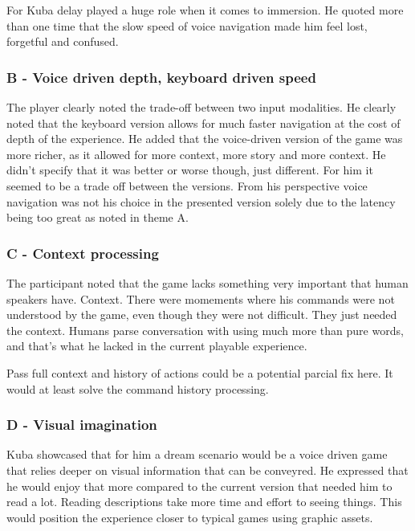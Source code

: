 For Kuba delay played a huge role when it comes to immersion. He quoted more than one time that the slow speed of voice navigation made him feel lost, forgetful and confused. 

\subsubsection{B - Voice driven depth, keyboard driven speed}

The player clearly noted the trade-off between two input modalities. He clearly noted that the keyboard version allows for much faster navigation at the cost of depth of the experience. He added that the voice-driven version of the game was more richer, as it allowed for more context, more story and more context. He didn't specify that it was better or worse though, just different. For him it seemed to be a trade off between the versions. From his perspective voice navigation was not his choice in the presented version solely due to the latency being too great as noted in theme A. 


\subsubsection{C - Context processing}

The participant noted that the game lacks something very important that human speakers have. Context. There were momements where his commands were not understood by the game, even though they were not difficult. They just needed the context. Humans parse conversation with using much more than pure words, and that's what he lacked in the current playable experience.


Pass full context and history of actions could be a potential parcial fix here. It would at least solve the command history processing. 

\subsubsection{D - Visual imagination}

Kuba showcased that for him a dream scenario would be a voice driven game that relies deeper on visual information that can be conveyred. He expressed that he would enjoy that more compared to the current version that needed him to read a lot. Reading descriptions take more time and effort to seeing things. This would position the experience closer to typical games using graphic assets. 


